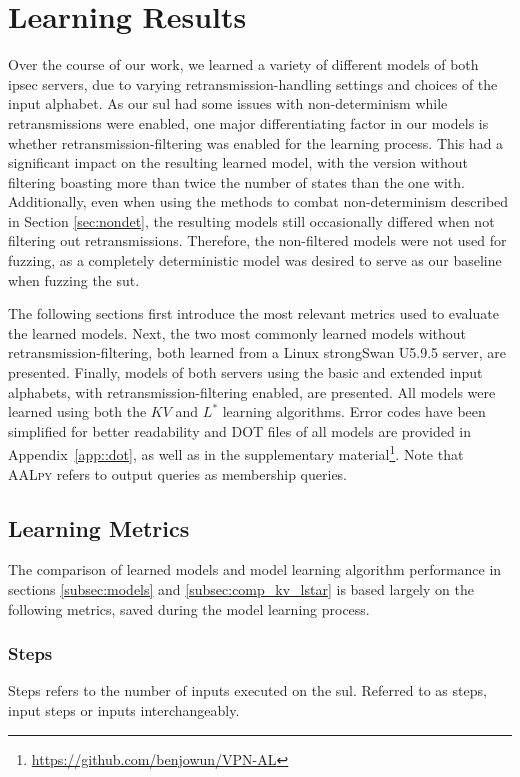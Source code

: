 \section{Learning Results} \label{sec:learnresults}
Over the course of our work, we learned a variety of different models of both \ac{ipsec} servers, due to varying retransmission-handling settings and choices of the input alphabet. As our \ac{sul} had some issues with non-determinism while retransmissions were enabled, one major differentiating factor in our models is whether retransmission-filtering was enabled for the learning process. This had a significant impact on the resulting learned model, with the version without filtering boasting more than twice the number of states than the one with. Additionally, even when using the methods to combat non-determinism described in Section \ref{sec:nondet}, the resulting models still occasionally differed when not filtering out retransmissions. Therefore, the non-filtered models were not used for fuzzing, as a completely deterministic model was desired to serve as our baseline when fuzzing the \ac{sut}.

The following sections first introduce the most relevant metrics used to evaluate the learned models. Next, the two most commonly learned models without retransmission-filtering, both learned from a Linux strongSwan U5.9.5 server, are presented. Finally, models of both servers using the basic and extended input alphabets, with retransmission-filtering enabled, are presented. All models were learned using both the $KV$ and $L^*$ learning algorithms. Error codes have been simplified for better readability and DOT files of all models are provided in Appendix~\ref{app::dot}, as well as in the supplementary material\footnote{\url{https://github.com/benjowun/VPN-AL}}. Note that \textsc{AALpy} refers to output queries as membership queries.

\newpage

\subsection{Learning Metrics} \label{subsec:metrics}
The comparison of learned models and model learning algorithm performance in sections \ref{subsec:models} and \ref{subsec:comp_kv_lstar} is based largely on the following metrics, saved during the model learning process.

\subsubsection*{Steps}
Steps refers to the number of inputs executed on the \ac{sul}. Referred to as steps, input steps or inputs interchangeably.

